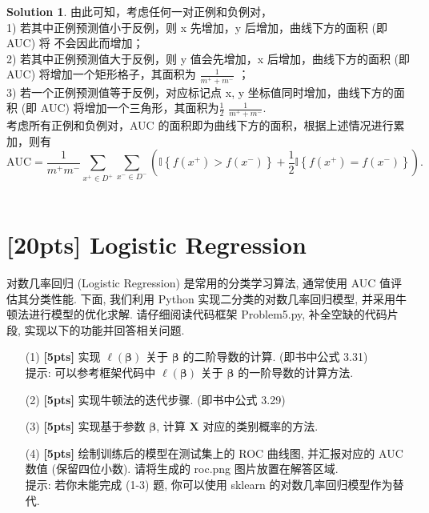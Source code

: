 \documentclass[a4paper,UTF8]{article}
\numberwithin{equation}{section}
\theoremstyle{definition}
\newtheorem*{solution}{Solution}
\begin{document}
\begin{solution}
由此可知，考虑任何一对正例和负例对，\\
1) 若其中正例预测值小于反例，则 x 先增加，y 后增加，曲线下方的面积 (即 AUC) 将
不会因此而增加；\\
2) 若其中正例预测值大于反例，则 y 值会先增加，x 后增加，曲线下方的面积 (即 AUC)
将增加一个矩形格子，其面积为 $\frac{1}{m^{+}+m^{-}}$ ；\\
3) 若一个正例预测值等于反例，对应标记点 x, y 坐标值同时增加，曲线下方的面积 (即
AUC) 将增加一个三角形，其面积为$\frac{1}{2}$ $\frac{1}{m^{+}+m^{-}}$.\\
考虑所有正例和负例对，AUC 的面积即为曲线下方的面积，根据上述情况进行累加，则有\\
 \begin{equation}
            \text{AUC} = \frac{1}{m^+m^-}\sum_{x^+\in D^+}\sum_{x^-\in D^-}\left(\mathbb{I}\left\{f(x^+) > f(x^-)\right\}+\frac{1}{2}\mathbb{I}\left\{f(x^+)=f(x^-)\right\}\right).
    \end{equation} 
    ~\\
\end{solution}


\newpage
\section{[20pts] Logistic Regression}
对数几率回归 (Logistic Regression) 是常用的分类学习算法, 通常使用 AUC 值评估其分类性能. 下面, 我们利用 Python 实现二分类的对数几率回归模型, 并采用牛顿法进行模型的优化求解. 请仔细阅读代码框架 Problem5.py, 补全空缺的代码片段, 实现以下的功能并回答相关问题.
\begin{enumerate}
    \item[(1)] \textbf{[5pts]} 实现 $\ell(\mathbf{\beta})$ 关于 $\mathbf{\beta}$ 的二阶导数的计算. (即书中公式 3.31)\\提示: 可以参考框架代码中 $\ell(\mathbf{\beta})$ 关于 $\mathbf{\beta}$ 的一阶导数的计算方法.
    \item[(2)] \textbf{[5pts]} 实现牛顿法的迭代步骤. (即书中公式 3.29)
    \item[(3)] \textbf{[5pts]} 实现基于参数 $\mathbf{\beta}$, 计算 $\mathbf{X}$ 对应的类别概率的方法.
    \item[(4)] \textbf{[5pts]} 绘制训练后的模型在测试集上的 ROC 曲线图, 并汇报对应的 AUC 数值 (保留四位小数). 请将生成的 roc.png 图片放置在解答区域.\\提示: 若你未能完成 (1-3) 题, 你可以使用 sklearn 的对数几率回归模型作为替代.
\end{enumerate}
\end{document}
